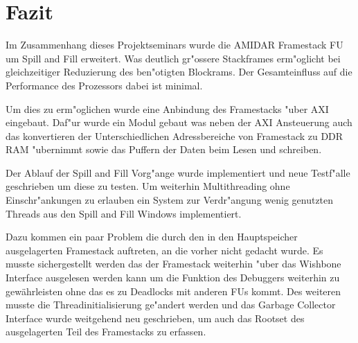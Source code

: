 \chapter{Fazit}
\label{cha:Fazit}

Im Zusammenhang dieses Projektseminars wurde die AMIDAR Framestack FU um Spill and Fill erweitert. Was deutlich gr"o{ss}ere Stackframes erm"oglicht bei gleichzeitiger Reduzierung des ben"otigten Blockrams. Der Gesamteinfluss auf die Performance des Prozessors dabei ist minimal. 

Um dies zu erm"oglichen wurde eine Anbindung des Framestacks "uber AXI eingebaut. Daf"ur wurde ein Modul gebaut was neben der AXI Ansteuerung auch das konvertieren der Unterschiedlichen Adressbereiche von Framestack zu DDR RAM "ubernimmt sowie das Puffern der Daten beim Lesen und schreiben.  

Der Ablauf der Spill and Fill Vorg"ange wurde implementiert und neue Testf"alle geschrieben um diese zu testen. 
Um weiterhin Multithreading ohne Einschr"ankungen zu erlauben ein System zur Verdr"angung wenig genutzten Threads aus den Spill and Fill Windows implementiert. 

Dazu kommen ein paar Problem die durch den in den Hauptspeicher ausgelagerten Framestack auftreten, an die vorher nicht gedacht wurde. 
Es musste sichergestellt werden das der Framestack weiterhin "uber das Wishbone Interface ausgelesen werden kann um die Funktion des Debuggers weiterhin zu gewährleisten ohne das es zu Deadlocks mit anderen FUs kommt. Des weiteren musste die Threadinitialisierung ge"andert werden und das Garbage Collector Interface wurde weitgehend neu geschrieben, um auch das Rootset des ausgelagerten Teil des Framestacks zu erfassen.  